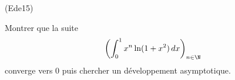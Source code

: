 \begin{tiny}(Ede15)\end{tiny} 
Montrer que la suite
\begin{displaymath}
\left( \int_0^1x^n\ln(1+x^2)\,dx\right)_{n\in\N} 
\end{displaymath}
converge vers 0 puis chercher un développement asymptotique.